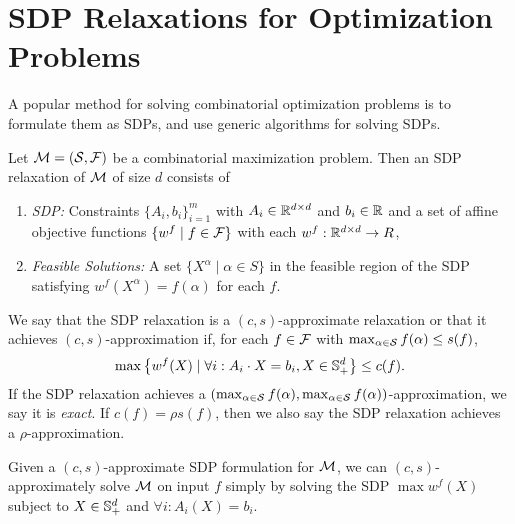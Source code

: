 \section{SDP Relaxations for Optimization Problems}\label{prelims_sdp_relaxations}
A popular method for solving combinatorial optimization problems is to formulate them as SDPs, and use generic algorithms  for solving SDPs.
\begin{definition}
Let $\mathcal M = (\mathcal S, \mathcal F)$ be a combinatorial maximization problem. Then an
  SDP relaxation of \(\mathcal M\)
  of size \(d\)
  consists of
	\begin{enumerate}
	\item \emph{SDP:} Constraints $\{A_i, b_i\}_{i=1}^m$ with $A_i \in \mathbb R^{d \times d}$ and $b_i \in \mathbb R$ and a set of affine objective functions $\{w^f \mid f \in \mathcal F\}$ with each $w^f: \mathbb R^{d \times d} \rightarrow R$,
	\item \emph{Feasible Solutions:} A set $\{X^\alpha \mid \alpha \in S\}$ in the feasible region of the SDP satisfying $w^f(X^\alpha) = f(\alpha)$ for each $f$.
	\end{enumerate}
	We say that the SDP relaxation is a $(c,s)$-approximate relaxation or that it achieves $(c,s)$-approximation if, for each
	$f \in \mathcal F$ with $\max_{\alpha \in \mathcal S} f(\alpha) \leq s(f)$,
	\[\max \left\{ w^f(X) \mid \forall i: A_i \cdot X = b_i, X \in \mathbb{S}^{d}_+\right\} \leq c(f).\]
	If the SDP relaxation achieves a $(\max_{\alpha\in \mathcal S} f(\alpha), \max_{\alpha\in \mathcal S} f(\alpha))$-approximation, we say it is \emph{exact}. If $c(f) = \rho s(f)$, then we also say the SDP relaxation achieves a $\rho$-approximation.
\end{definition}
Given a $(c,s)$-approximate SDP formulation for $\mathcal M$, we can $(c,s)$-approximately solve $\mathcal M$ on input $f$ simply by solving
the SDP $\max w^f(X)$ subject to $X \in \mathbb{S}^{d}_+$ and $\forall i: A_i(X) = b_i$.

